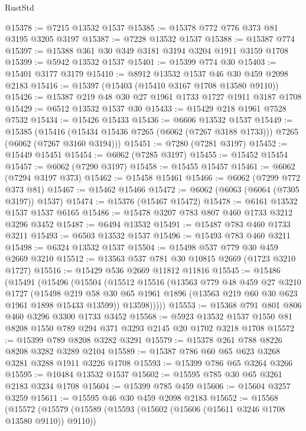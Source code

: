 \begin{lexlean}{RustStd}
\begin{coremodule}
@15378 := @7215 @13532 @1537
@15385 := @15378 @772 @776 @373 @81 @3195 @3205 @3197
@15387 := @7228 @13532 @1537
@15388 := @15387 @774
@15397 := @15388 @361 @30 @349 @3181 @3194 @3204 @1911 @3159 @1708
@15399 := @5942 @13532 @1537
@15401 := @15399 @774 @30
@15403 := @15401 @3177 @3179
@15410 := @8912 @13532 @1537 @46 @30 @459 @2098 @2183
@15416 := @15397 (@15403 (@15410 @3167 @1708 @13580 @9110))
@15426 := @15387 @219 @48 @30 @27 @1961 @1733 @1727 @1911 @3187 @1708
@15429 := @6512 @13532 @1537 @30
@15433 := @15429 @218 @1961 @7528 @7532
@15434 := @15426 @15433
@15436 := @6606 @13532 @1537
@15449 := @15385
    (@15416 (@15434 @15436 @7265 (@6062 (@7267 @3188 @1733))) @7265 (@6062 (@7267 @3160 @3194)))
@15451 := @7280 (@7281 @3197)
@15452 := @15449 @15451
@15454 := @6062 (@7285 @3197)
@15455 := @15452 @15454
@15457 := @6062 (@7290 @3197)
@15458 := @15455 @15457
@15461 := @6062 (@7294 @3197 @373)
@15462 := @15458 @15461
@15466 := @6062 (@7299 @772 @373 @81)
@15467 := @15462 @15466
@15472 := @6062 (@6063 (@6064 (@7305 @3197)) @1537)
@15474 := @15376 (@15467 @15472)
@15478 := @6161 @13532 @1537 @1537 @6165
@15486 := @15478 @3207 @783 @807 @460 @1733 @3212 @3296 @3452
@15487 := @6494 @13532
@15491 := @15487 @783 @460 @1733 @3211
@15493 := @6503 @13532 @1537
@15496 := @15493 @783 @460 @3211
@15498 := @6324 @13532 @1537
@15504 := @15498 @537 @779 @30 @459 @2669 @3210
@15512 := @13563 @537 @781 @30 @10815 @2669 (@1723 @3210 @1727)
@15516 := @15429 @536 @2669 @11812 @11816
@15545 := @15486
    (@15491
      (@15496
        (@15504
          (@15512
            @15516
            (@13563
              @779
              @48
              @459
              @27
              @3210
              @1727
              (@15498
                @219
                @58
                @30
                @65
                @1961
                @1896
                (@13563 @219 @60 @30 @623 @1961 @1898 @15433 @13599))
              @13598)))))
@15553 := @15368 @791 @801 @806 @460 @3296 @3300 @1733 @3452
@15568 := @5923 @13532 @1537 @1550 @81 @8208 @1550 @789 @294 @371 @3293 @2145 @20 @1702 @3218 @1708
@15572 := @15399 @789 @8208 @3282 @3291
@15579 := @15378 @261 @788 @8226 @8208 @3282 @3289 @2104
@15589 := @15387 @786 @60 @65 @623 @3268 @3281 @3288 @1911 @3226 @1708
@15593 := @15399 @786 @65 @3264 @3266
@15595 := @10484 @13532 @1537
@15602 := @15595 @785 @30 @65 @3261 @2183 @3234 @1708
@15604 := @15399 @785 @459
@15606 := @15604 @3257 @3259
@15611 := @15595 @46 @30 @459 @2098 @2183
@15652 := @15568
    (@15572
      (@15579
        (@15589
          (@15593 (@15602 (@15606 (@15611 @3246 @1708 @13580 @9110)) @9110))

\end{coremodule}
\end{lexlean}
